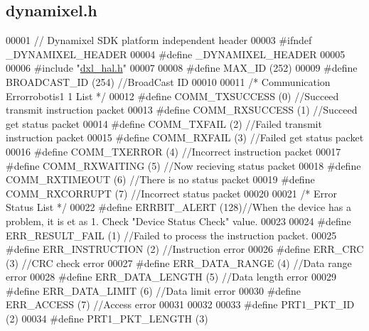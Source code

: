 \hypertarget{a00015_source}{}\subsection{dynamixel.\+h}
\label{a00015_source}

\begin{DoxyCode}
00001 \textcolor{comment}{// Dynamixel SDK platform independent header}
00003 \textcolor{preprocessor}{#ifndef \_DYNAMIXEL\_HEADER}
00004 \textcolor{preprocessor}{#define \_DYNAMIXEL\_HEADER}
00005 
00006 \textcolor{preprocessor}{#include "\hyperlink{a00013}{dxl\_hal.h}"}
00007 
00008 \textcolor{preprocessor}{#define MAX\_ID              (252)}
00009 \textcolor{preprocessor}{#define BROADCAST\_ID        (254)  //BroadCast ID}
00010 
00011 \textcolor{comment}{/* Communication Errorrobotis1  1 List */}
00012 \textcolor{preprocessor}{#define COMM\_TXSUCCESS      (0)  //Succeed transmit instruction packet}
00013 \textcolor{preprocessor}{#define COMM\_RXSUCCESS      (1)  //Succeed get status packet}
00014 \textcolor{preprocessor}{#define COMM\_TXFAIL         (2)  //Failed transmit instruction packet}
00015 \textcolor{preprocessor}{#define COMM\_RXFAIL         (3)  //Failed get status packet}
00016 \textcolor{preprocessor}{#define COMM\_TXERROR        (4)  //Incorrect instruction packet}
00017 \textcolor{preprocessor}{#define COMM\_RXWAITING      (5)  //Now recieving status packet}
00018 \textcolor{preprocessor}{#define COMM\_RXTIMEOUT      (6)  //There is no status packet}
00019 \textcolor{preprocessor}{#define COMM\_RXCORRUPT      (7)  //Incorrect status packet}
00020 
00021 \textcolor{comment}{/* Error Status List */}
00022 \textcolor{preprocessor}{#define ERRBIT\_ALERT        (128)//When the device has a problem, it is et as 1. Check "Device Status
       Check" value.}
00023 
00024 \textcolor{preprocessor}{#define ERR\_RESULT\_FAIL     (1)  //Failed to process the instruction packet.}
00025 \textcolor{preprocessor}{#define ERR\_INSTRUCTION     (2)  //Instruction error}
00026 \textcolor{preprocessor}{#define ERR\_CRC             (3)  //CRC check error}
00027 \textcolor{preprocessor}{#define ERR\_DATA\_RANGE      (4)  //Data range error}
00028 \textcolor{preprocessor}{#define ERR\_DATA\_LENGTH     (5)  //Data length error}
00029 \textcolor{preprocessor}{#define ERR\_DATA\_LIMIT      (6)  //Data limit error}
00030 \textcolor{preprocessor}{#define ERR\_ACCESS          (7)  //Access error}
00031 
00032 
00033 \textcolor{preprocessor}{#define PRT1\_PKT\_ID                 (2)}
00034 \textcolor{preprocessor}{#define PRT1\_PKT\_LENGTH             (3)}

\end{DoxyCode}
